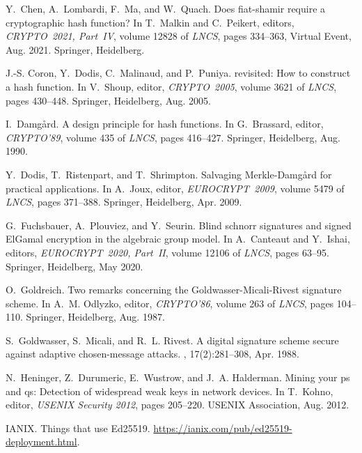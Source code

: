 \begin{thebibliography}{10}
Y.~Chen, A.~Lombardi, F.~Ma, and W.~Quach.
\newblock Does fiat-shamir require a cryptographic hash function?
\newblock In T.~Malkin and C.~Peikert, editors, {\em CRYPTO~2021, Part~IV},
  volume 12828 of {\em {LNCS}}, pages 334--363, Virtual Event, Aug. 2021.
  Springer, Heidelberg.

J.-S. Coron, Y.~Dodis, C.~Malinaud, and P.~Puniya.
 revisited: How to construct a hash function.
\newblock In V.~Shoup, editor, {\em CRYPTO~2005}, volume 3621 of {\em {LNCS}},
  pages 430--448. Springer, Heidelberg, Aug. 2005.

I.~Damg{\aa}rd.
\newblock A design principle for hash functions.
\newblock In G.~Brassard, editor, {\em CRYPTO'89}, volume 435 of {\em {LNCS}},
  pages 416--427. Springer, Heidelberg, Aug. 1990.

Y.~Dodis, T.~Ristenpart, and T.~Shrimpton.
\newblock Salvaging {Merkle}-{Damg{\aa}rd} for practical applications.
\newblock In A.~Joux, editor, {\em EUROCRYPT~2009}, volume 5479 of {\em
  {LNCS}}, pages 371--388. Springer, Heidelberg, Apr. 2009.

G.~Fuchsbauer, A.~Plouviez, and Y.~Seurin.
\newblock Blind schnorr signatures and signed {ElGamal} encryption in the
  algebraic group model.
\newblock In A.~Canteaut and Y.~Ishai, editors, {\em EUROCRYPT~2020, Part~II},
  volume 12106 of {\em {LNCS}}, pages 63--95. Springer, Heidelberg, May 2020.

O.~Goldreich.
\newblock Two remarks concerning the {Goldwasser}-{Micali}-{Rivest} signature
  scheme.
\newblock In A.~M. Odlyzko, editor, {\em CRYPTO'86}, volume 263 of {\em
  {LNCS}}, pages 104--110. Springer, Heidelberg, Aug. 1987.

S.~Goldwasser, S.~Micali, and R.~L. Rivest.
\newblock A digital signature scheme secure against adaptive chosen-message
  attacks.
, 17(2):281--308, Apr. 1988.

N.~Heninger, Z.~Durumeric, E.~Wustrow, and J.~A. Halderman.
\newblock Mining your ps and qs: Detection of widespread weak keys in network
  devices.
\newblock In T.~Kohno, editor, {\em USENIX Security 2012}, pages 205--220.
  {USENIX} Association, Aug. 2012.

{IANIX}.
\newblock Things that use {E}d25519.
\newblock \url{https://ianix.com/pub/ed25519-deployment.html}.


\end{thebibliography}
